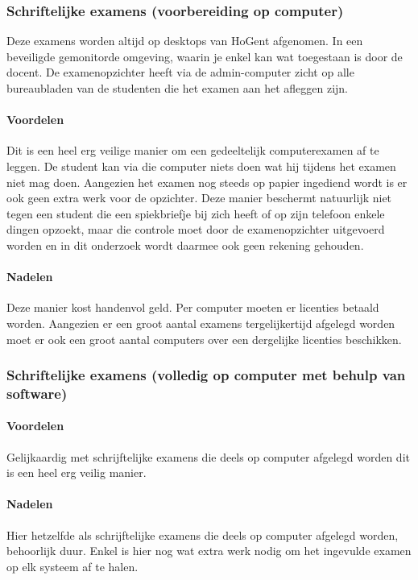 \subsubsection{Schriftelijke examens (voorbereiding op computer) }

Deze examens worden altijd op desktops van HoGent afgenomen. In een beveiligde gemonitorde omgeving, waarin je enkel kan wat toegestaan is door de docent. De examenopzichter heeft via de admin-computer zicht op alle bureaubladen van de studenten die het examen aan het afleggen zijn. 

\paragraph{Voordelen}
Dit is een heel erg veilige manier om een gedeeltelijk computerexamen af te leggen. De student kan via die computer niets doen wat hij tijdens het examen niet mag doen. Aangezien het examen nog steeds op papier ingediend wordt is er ook geen extra werk voor de opzichter. Deze manier beschermt natuurlijk niet tegen een student die een spiekbriefje bij zich heeft of op zijn telefoon enkele dingen opzoekt, maar die controle moet door de examenopzichter uitgevoerd worden en in dit onderzoek wordt daarmee ook geen rekening gehouden.

\paragraph{Nadelen}
Deze manier kost handenvol geld. Per computer moeten er licenties betaald worden. Aangezien er een groot aantal examens tergelijkertijd afgelegd worden moet er ook een groot aantal computers over een dergelijke licenties beschikken.


\subsubsection{Schriftelijke examens (volledig op computer met behulp van software)}

\paragraph{Voordelen}
Gelijkaardig met schrijftelijke examens die deels op computer afgelegd worden dit is een heel erg veilig manier.

\paragraph{Nadelen}
Hier hetzelfde als schrijftelijke examens die deels op computer afgelegd worden, behoorlijk duur. Enkel is hier nog wat extra werk nodig om het ingevulde examen op elk systeem af te halen.

